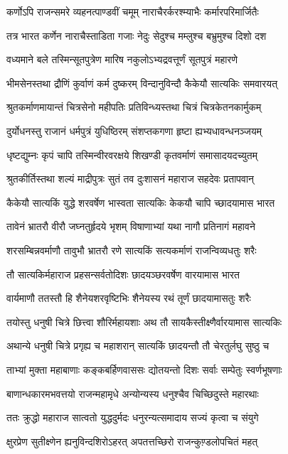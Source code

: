 \twolineshloka
{कर्णोऽपि राजन्समरे व्यहनत्पाण्डवीं चमूम्}
{नाराचैरर्करश्म्याभैः कर्मारपरिमार्जितैः}


\twolineshloka
{तत्र भारत कर्णेन नाराचैस्ताडिता गजाः}
{नेदुः सेदुश्च मम्लुश्च बभ्रुमुश्च दिशो दश}


\twolineshloka
{वध्यमाने बले तस्मिन्सूतपुत्रेण मारिष}
{नकुलोऽभ्यद्रवत्तूर्णं सूतपुत्रं महारणे}


\twolineshloka
{भीमसेनस्तथा द्रौणिं कुर्वाणं कर्म दुष्करम्}
{विन्दानुविन्दौ कैकेयौ सात्यकिः समवारयत्}


\twolineshloka
{श्रुतकर्माणमायान्तं चित्रसेनो महीपतिः}
{प्रतिविन्ध्यस्तथा चित्रं चित्रकेतनकार्मुकम्}


\twolineshloka
{दुर्योधनस्तु राजानं धर्मपुत्रं युधिष्ठिरम्}
{संशप्तकगणा हृष्टा ह्यभ्यधावन्धनञ्जयम्}


\twolineshloka
{धृष्टद्युम्नः कृपं चापि तस्मिन्वीरवरक्षये}
{शिखण्डी कृतवर्माणं समासादयदच्युतम्}


\twolineshloka
{श्रुतकीर्तिस्तथा शल्यं माद्रीपुत्रः सुतं तव}
{दुःशासनं महाराज सहदेवः प्रतापवान्}


\twolineshloka
{कैकेयौ सात्यकिं युद्धे शरवर्षेण भास्वता}
{सात्यकिः केकयौ चापि च्छादयामास भारत}


\twolineshloka
{तावेनं भ्रातरौ वीरौ जघ्नतुर्हृदये भृशम्}
{विषाणाभ्यां यथा नागौ प्रतिनागं महावने}


\twolineshloka
{शरसम्बिन्नवर्माणौ तावुभौ भ्रातरौ रणे}
{सात्यकिं सत्यकर्माणं राजन्विव्यधतुः शरैः}


\twolineshloka
{तौ सात्यकिर्महाराज प्रहसन्सर्वतोदिशः}
{छादयञ्छरवर्षेण वारयामास भारत}


\twolineshloka
{वार्यमाणौ ततस्तौ हि शैनेयशरवृष्टिभिः}
{शैनेयस्य रथं तूर्णं छादयामासतुः शरैः}


\twolineshloka
{तयोस्तु धनुषी चित्रे छित्त्वा शौरिर्महायशाः}
{अथ तौ सायकैस्तीक्ष्णैर्वारयामास सात्यकिः}


\twolineshloka
{अथान्ये धनुषी चित्रे प्रगृह्य च महाशरान्}
{सात्यकिं छादयन्तौ तौ चेरतुर्लघु सुष्ठु च}


\twolineshloka
{ताभ्यां मुक्ता महाबाणाः कङ्कबर्हिणवाससः}
{द्योतयन्तो दिशः सर्वाः सम्पेतुः स्वर्णभूषणाः}


\twolineshloka
{बाणान्धकारमभवत्तयो राजन्महामृधे}
{अन्योन्यस्य धनुश्चैव चिच्छिदुस्ते महारथाः}


\twolineshloka
{ततः क्रुद्धो महाराज सात्वतो युद्धदुर्मदः}
{धनुरन्यत्समादाय सज्यं कृत्वा च संयुगे}


\twolineshloka
{क्षुरप्रेण सुतीक्ष्णेन ह्यनुविन्दशिरोऽहरत्}
{अपतत्तच्छिरो राजन्कुण़्डलोपचितं महत्}


